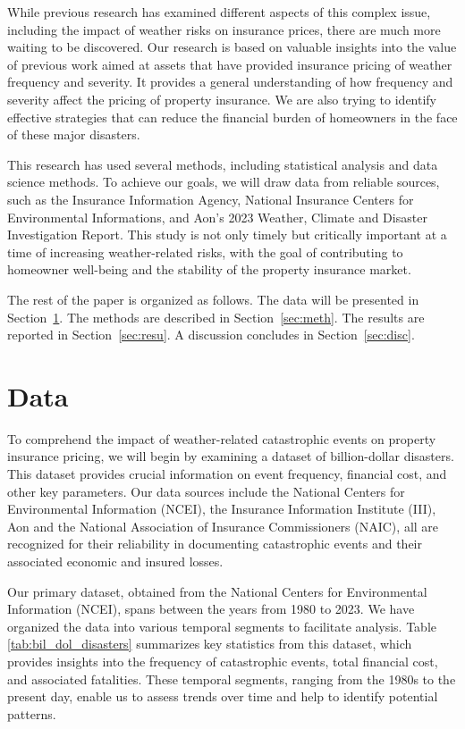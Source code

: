 \documentclass[12pt]{article}
\begin{document}
While previous research has examined different aspects of this complex issue, including the impact of weather risks on insurance 
prices, there are much more waiting to be discovered. Our research is based on valuable insights into the value of previous work 
\cite{hurricaneco} aimed at assets that have provided insurance pricing of weather frequency and severity. It provides a general 
understanding of how frequency and severity affect the pricing of property insurance. We are also trying to identify effective 
strategies that can reduce the financial burden of homeowners in the face of these major disasters.


This research has used several methods, including statistical analysis and data science methods. To achieve our goals, we will draw 
data from reliable sources, such as the Insurance Information Agency, National Insurance Centers for Environmental Informations, and 
Aon's 2023 Weather, Climate and Disaster Investigation Report. This study is not only timely but critically important at a time of 
increasing weather-related risks, with the goal of contributing to homeowner well-being and the stability of the property insurance 
market.

The rest of the paper is organized as follows.
The data will be presented in Section~\ref{sec:data}.
The methods are described in Section~\ref{sec:meth}.
The results are reported in Section~\ref{sec:resu}.
A discussion concludes in Section~\ref{sec:disc}.


\section{Data}
\label{sec:data}
To comprehend the impact of weather-related catastrophic events on property insurance pricing, we will begin by examining a dataset of 
billion-dollar disasters. This dataset provides crucial information on event frequency, financial cost, and other key parameters. Our 
data sources include the National Centers for Environmental Information (NCEI)\cite{ncei}, the Insurance Information Institute 
(III)\cite{iii}, Aon\cite{aon} and the National Association of Insurance Commissioners (NAIC)\cite{naic}, all are recognized for their 
reliability in documenting catastrophic events and their associated economic and insured losses.

Our primary dataset, obtained from the National Centers for Environmental Information (NCEI)\cite{ncei}, spans between the years from 
1980 to 2023. We have organized the data into various temporal segments to facilitate analysis. Table \ref{tab:bil_dol_disasters} 
summarizes key statistics from this dataset, which provides insights into the frequency of catastrophic events, total financial cost, and 
associated fatalities. These temporal segments, ranging from the 1980s to the present day, enable us to assess trends over time and 
help to identify potential patterns.
\end{document}

